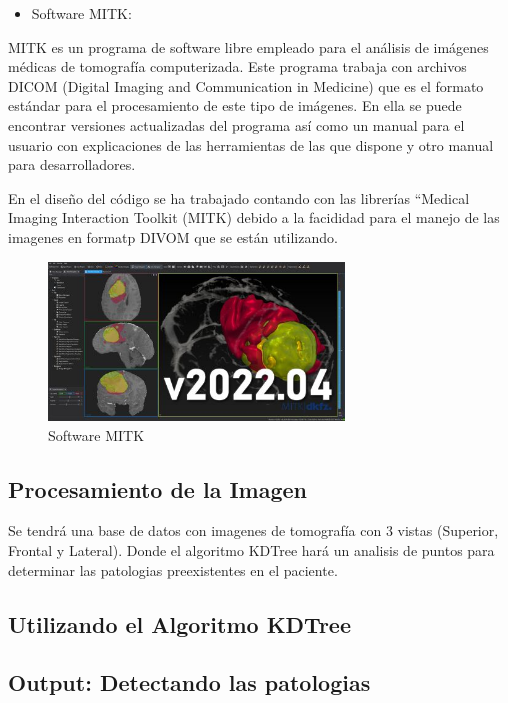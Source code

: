\documentclass{article}
\begin{document}
\begin{itemize}
            \item Software MITK:
\end{itemize}

MITK es un programa de software libre empleado para el análisis de imágenes médicas de
tomografía computerizada. Este programa trabaja con archivos DICOM (Digital Imaging and
Communication in Medicine) que es el formato estándar para el procesamiento de este tipo de
imágenes. En ella se puede encontrar versiones actualizadas del programa así como un manual para el usuario con explicaciones de las herramientas de las que dispone y otro manual para desarrolladores.

En el diseño del código se ha trabajado contando con las librerías “Medical Imaging Interaction Toolkit (MITK) debido a la facididad para el manejo de las imagenes en formatp DIVOM que se están utilizando.

\begin{figure}[H]
\centering
\includegraphics[width=0.7\textwidth]{img/MITK.jpg}
\caption{Software MITK}
\end{figure}

\subsection{Procesamiento de la Imagen}

Se tendrá una base de datos con imagenes de tomografía con 3 vistas (Superior, Frontal y Lateral). Donde el algoritmo KDTree hará un analisis de puntos para determinar las patologias preexistentes en el paciente.

\subsection{Utilizando el Algoritmo KDTree}
\subsection{Output: Detectando las patologias}
\end{document}

